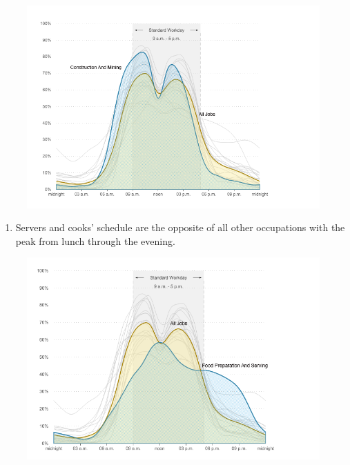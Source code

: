 \documentclass[]{book}
\providecommand{\tightlist}{%
  \setlength{\itemsep}{0pt}\setlength{\parskip}{0pt}}
\begin{document}
\begin{figure}
\centering
\includegraphics{images/construction.png}
\caption{}
\end{figure}

\begin{enumerate}
\def\labelenumi{\arabic{enumi}.}
\setcounter{enumi}{1}
\tightlist
\item
  Servers and cooks' schedule are the opposite of all other occupations
  with the peak from lunch through the evening.
\end{enumerate}

\begin{figure}
\centering
\includegraphics{images/server_cook.png}
\caption{}
\end{figure}
\end{document}
